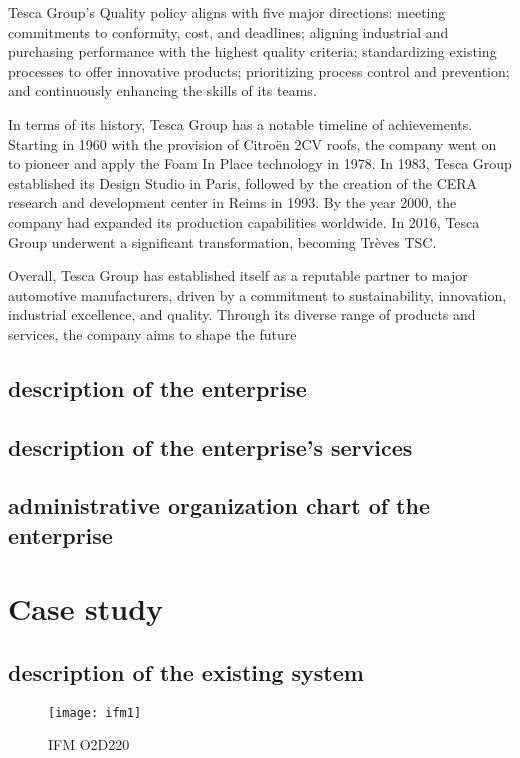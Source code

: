 Tesca Group's Quality policy aligns with five major directions: meeting commitments to conformity, cost, and deadlines; aligning industrial and purchasing performance with the highest quality criteria; standardizing existing processes to offer innovative products; prioritizing process control and prevention; and continuously enhancing the skills of its teams.

In terms of its history, Tesca Group has a notable timeline of achievements. Starting in 1960 with the provision of Citroën 2CV roofs, the company went on to pioneer and apply the Foam In Place technology in 1978. In 1983, Tesca Group established its Design Studio in Paris, followed by the creation of the CERA research and development center in Reims in 1993. By the year 2000, the company had expanded its production capabilities worldwide. In 2016, Tesca Group underwent a significant transformation, becoming Trèves TSC.

Overall, Tesca Group has established itself as a reputable partner to major automotive manufacturers, driven by a commitment to sustainability, innovation, industrial excellence, and quality. Through its diverse range of products and services, the company aims to shape the future
\subsection{description of the  enterprise }
\subsection{description of the  enterprise's services}
\subsection{administrative organization chart of the enterprise}
\vspace{1em}
\section{Case study}

\subsection{description of the existing system }
\FloatBarrier
\begin{figure}[h]

         \centering
        \texttt{[image: ifm1]}
   
        \caption{IFM O2D220}
        \label{fig:IFM O2D220}
\FloatBarrier
    \end{figure}

